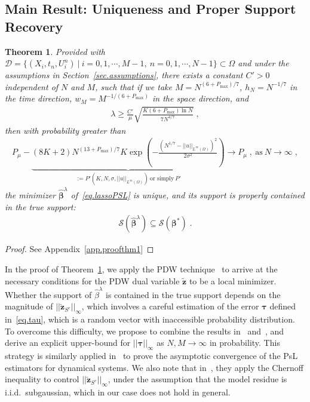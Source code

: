 \documentclass[a4paper,11pt]{article}
\newcommand{\btau}{\bm{\tau}}
\newcommand{\bbeta}{\bm{\beta}}
\newcommand{\mS}{\mathcal{S}}
\newtheorem{thm}{Theorem}[section]
\begin{document}
\subsection{Main Result: Uniqueness and Proper Support Recovery}

\begin{thm}\label{thm1}
Provided with $\mathcal{D}=\{(X_i,t_n,U_i^n)~|~i=0,1,\cdots,M-1,~n=0,1,\cdots,N-1\}\subset\Omega$ and under the assumptions in Section~\ref{sec.assumptions}, there exists a constant $C'>0$ independent of $N$ and $M$, such that if we take $M = N^{(6+P_{\max})/7}$, $h_N=N^{-1/7}$ in the time direction, $w_{M} = M^{-1/(6+P_{\max})}$ in the space direction, and
\begin{align}
\lambda\geq \frac{C'}{\mu}\sqrt{\frac{K(6+P_{\max})\ln N}{7N^{4/7}}}\;,\label{lambdaBound}
\end{align}
then with probability greater than
\begin{align}
	P_\mu-\underbrace{(8K+2)N^{(13+P_{\max})/7}K\exp(-\frac{(N^{1/7}-||u||_{L^\infty(\Omega)})^2}{2\sigma^2})}_{:=P'(K,N,\sigma,||u||_{L^\infty(\Omega)})~\text{or simply}~P'}\longrightarrow P_\mu\;,~\text{as}~N\to\infty\;,\label{eq.probability}
\end{align}
the minimizer $\widehat{\bbeta}^\lambda$ of~\eqref{eq.lassoPSL} is unique, and its support is properly contained in the true support:
\begin{align}
\mS(\widehat{\bbeta}^\lambda)\subseteq\mS(\bbeta^*)\;.
\end{align}	
\end{thm}
\begin{proof}
See Appendix~\ref{app.proofthm1}	
\end{proof}


In the proof of Theorem~\ref{thm1}, we apply the PDW technique~\cite{wainwright2009sharp} to arrive at the necessary conditions for the PDW dual variable $\widetilde{\mathbf{z}}$ to be a local minimizer. Whether the support of $\widehat{\beta}^\lambda$ is contained in the true support depends on the magnitude of $||\check{\mathbf{z}}_{S^c}||_\infty$, which involves a careful estimation of the error $\btau$ defined in~\eqref{eq.tau}, which is a random vector with inaccessible probability distribution.  To overcome this difficulty, we propose to combine the results in~\cite{fan1997local} and~\cite{mack1982weak}, and derive an explicit upper-bound  for $||\btau||_\infty$ as $N,M\to\infty$ in probability. This strategy is similarly applied in~\cite{liang2008parameter} to prove the asymptotic convergence of the PsL estimators for dynamical systems. We also note that in~\cite{wainwright2009sharp}, they apply the Chernoff inequality to control  $||\check{\mathbf{z}}_{S^c}||_\infty$, under the assumption that the model residue is i.i.d.~subgaussian, which in our case does not hold in general.
\end{document}
